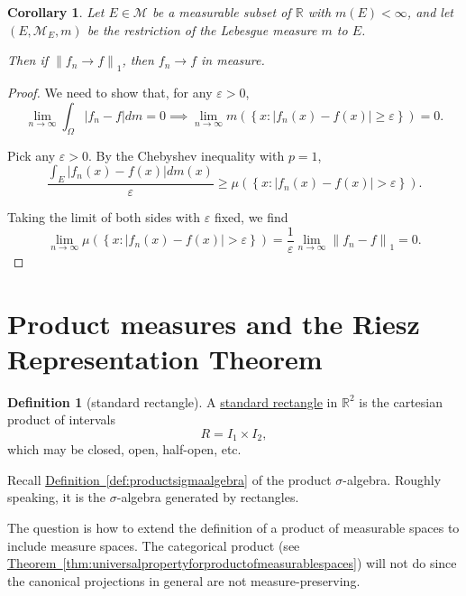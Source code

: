 \documentclass[a4paper,12pt]{scrreprt}
\newcommand{\R}{\mathbb{R}}
\newcommand{\defn}[1]{\ul{#1}}
\newcommand{\norm}[1]{\left\|#1\right\|}
\newcommand{\abs}[1]{\left|#1\right|}
\theoremstyle{definition}
\newtheorem{definition}{Definition}[section]
\theoremstyle{plain}
\newtheorem{corollary}{Corollary}[section]
\theoremstyle{remark}
\begin{document}
\begin{corollary}
  Let $E \in \mathcal{M}$ be a measurable subset of $\R$ with $m(E) < \infty$, and let $(E, \mathcal{M}_{E}, m)$ be the restriction of the Lebesgue measure $m$ to $E$.

  Then if $\norm{f_{n} \to f}_{1}$, then $f_{n} \to f$ in measure.
\end{corollary}
\begin{proof}
  We need to show that, for any $\varepsilon > 0$,
  \begin{equation*}
    \lim_{n \to \infty} \int_{\Omega} \abs{f_{n} - f} dm = 0 \implies \lim_{n \to \infty} m\left( \left\{ x\colon \abs{f_{n}(x) - f(x)} \geq \varepsilon \right\} \right) = 0.
  \end{equation*}

  Pick any $\varepsilon > 0$. By the Chebyshev inequality with $p=1$,
  \begin{equation*}
    \frac{\int_{E} \abs{f_{n}(x) - f(x)} dm(x)}{\varepsilon} \geq \mu\left( \left\{ x\colon \abs{f_{n}(x) - f(x)} > \varepsilon \right\} \right).
  \end{equation*}

  Taking the limit of both sides with $\varepsilon$ fixed, we find
  \begin{equation*}
    \lim_{n \to \infty} \mu\left( \left\{ x\colon \abs{f_{n}(x) - f(x)} > \varepsilon \right\} \right) = \frac{1}{\varepsilon} \lim_{n \to \infty} \norm{f_{n} - f}_{1} = 0.
  \end{equation*}
\end{proof}

\section{Product measures and the Riesz Representation Theorem}
\begin{definition}[standard rectangle]
  \label{def:standardrectangle}
  A \defn{standard rectangle} in $\R^{2}$ is the cartesian product of intervals
  \begin{equation*}
    R = I_{1} \times I_{2},
  \end{equation*}
  which may be closed, open, half-open, etc.
\end{definition}

Recall \hyperref[def:productsigmaalgebra]{Definition~\ref*{def:productsigmaalgebra}} of the product $\sigma$-algebra. Roughly speaking, it is the $\sigma$-algebra generated by rectangles.

The question is how to extend the definition of a product of measurable spaces to include measure spaces. The categorical product (see \hyperref[thm:universalpropertyforproductofmeasurablespaces]{Theorem~\ref*{thm:universalpropertyforproductofmeasurablespaces}}) will not do since the canonical projections in general are not measure-preserving.
\end{document}
